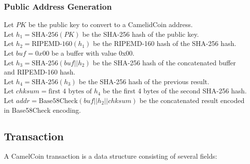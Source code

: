 \documentclass{article}
\begin{document}
\subsubsection{Public Address Generation}

Let $PK$ be the public key to convert to a CamelidCoin address.\\
Let $h_1 = \text{SHA-256}(PK)$ be the SHA-256 hash of the public key.\\
Let $h_2 = \text{RIPEMD-160}(h_1)$ be the RIPEMD-160 hash of the SHA-256 hash.\\
Let $buf = 0x00$ be a buffer with value 0x00.\\
Let $h_3 = \text{SHA-256}(buf || h_2)$ be the SHA-256 hash of the concatenated buffer and RIPEMD-160 hash.\\
Let $h_4 = \text{SHA-256}(h_3)$ be the SHA-256 hash of the previous result.\\
Let $chksum = \text{first 4 bytes of } h_4$ be the first 4 bytes of the second SHA-256 hash.\\
Let $addr = \text{Base58Check}(buf || h_2 || chksum)$ be the concatenated result encoded in Base58Check encoding.\\

\subsection{Transaction}

A CamelCoin transaction is a data structure consisting of several fields:
\end{document}
